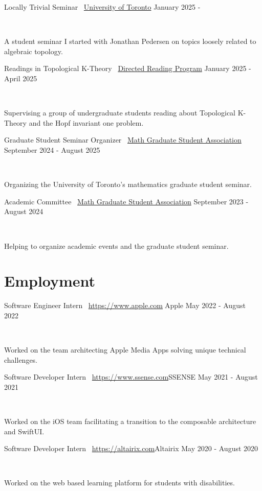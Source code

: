\documentclass[]{style}
\begin{document}
\begin{entrylist}

\vspace{1mm}

\entry
{Locally Trivial Seminar \ {\normalfont \underline{University of Toronto}}}
{January 2025 - }
{ ~ \vspace{-2.5mm}

A student seminar I started with Jonathan Pedersen on topics loosely related to algebraic topology.}

\entry
{Readings in Topological K-Theory \ {\normalfont \underline{Directed Reading Program}}}
{January 2025 - April 2025}
{ ~ \vspace{-2.5mm}

Supervising a group of undergraduate students reading about Topological K-Theory and the Hopf invariant one problem.}

\entry
{Graduate Student Seminar Organizer \ {\normalfont \underline{Math Graduate Student Association}}}
{September 2024 - August 2025}
{ ~ \vspace{-2.5mm}

Organizing the University of Toronto's mathematics graduate student seminar.}

\entry
{Academic Committee \ {\normalfont \underline{Math Graduate Student Association}}}
{September 2023 - August 2024}
{ ~ \vspace{-2.5mm}

Helping to organize academic events and the graduate student seminar.}

\end{entrylist}

\section{Employment}

\begin{entrylist}

\vspace{1mm}

\entry
{Software Engineer Intern \ {\normalfont \url{https://www.apple.com}{Apple}}}
{May 2022 - August 2022}
{ ~ \vspace{-2.5mm}

Worked on the team architecting Apple Media Apps solving unique technical challenges. }

\entry
{Software Developer Intern \ {\normalfont \url{https://www.ssense.com}{SSENSE}}}
{May 2021 - August 2021}
{ ~ \vspace{-2.5mm}

Worked on the iOS team facilitating a transition to the composable architecture and SwiftUI.}

\entry
{Software Developer Intern \ {\normalfont \url{https://altairix.com}{Altairix}}}
{May 2020 - August 2020}
{ ~ \vspace{-2.5mm}

Worked on the web based learning platform for students with disabilities.}

\end{entrylist}



\end{document}
